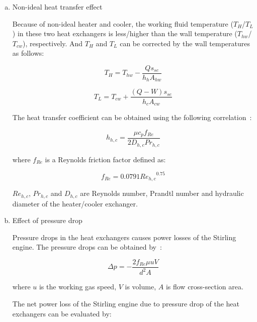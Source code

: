 \documentclass[preprint,5p, twocolumn]{elsarticle}
\begin{document}
\begin{enumerate}[a.]
\item Non-ideal heat transfer effect

Because of non-ideal heater and cooler, the working fluid temperature ($T_{H}$/$T_L$) in these two heat exchangers is less/higher than the wall temperature ($T_{hw}$/$T_{cw}$), respectively. And $T_{H}$ and $T_{L}$ can be corrected by the wall temperatures as follows:

\begin{equation}
	T_H = T_{hw} - \frac{Qs_{se}}{h_hA_{hw}}
	\label{eq:T_H}
\end{equation}

\begin{equation}
	T_L = T_{cw} + \frac{(Q-W)s_{se}}{h_cA_{cw}}
	\label{eq:T_L}
\end{equation}

The heat transfer coefficient can be obtained using the following correlation~\cite{Babaelahi2015}:

\begin{equation}
	h_{h,c} = \frac{\mu c_pf_{Re}}{2D_{h,c}Pr_{h,c}}
\end{equation}

where $f_{Re}$ is a Reynolds friction factor defined as:

\begin{equation}
	f_{Re} = 0.0791{Re_{h,c}}^{0.75}
\end{equation}

$Re_{h,c}$, $Pr_{h,c}$ and $D_{h,c}$ are Reynolds number, Prandtl number and hydraulic diameter of the heater/cooler exchanger.

\item Effect of pressure drop

Pressure drops in the heat exchangers causes power losses of the Stirling engine. The pressure drops can be obtained by~\cite{Urieli1984}:

\begin{equation}
	\Delta p = -\frac{2f_{Re}\mu u V}{d^2A}
\end{equation}

where $u$ is the working gas speed, $V$ is volume, $A$ is flow cross-section area.

The net power loss of the Stirling engine due to pressure drop of the heat exchangers can be evaluated by:


\end{enumerate}
\end{document}

